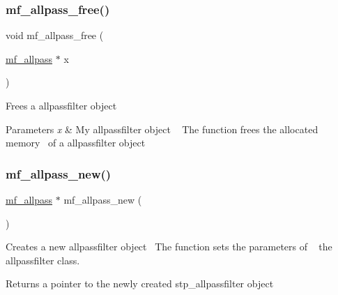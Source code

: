 \subsubsection{\texorpdfstring{mf\+\_\+allpass\+\_\+free()}{mf\_allpass\_free()}}
{\footnotesize\ttfamily void mf\+\_\+allpass\+\_\+free (\begin{DoxyParamCaption}\item[{\mbox{\hyperlink{structmf__allpass}{mf\+\_\+allpass}} $\ast$}]{x }\end{DoxyParamCaption})\hspace{0.3cm}{\ttfamily [related]}}



Frees a allpassfilter object~\newline
 


\begin{DoxyParams}{Parameters}
{\em x} & My allpassfilter object ~\newline
 The function frees the allocated memory~\newline
 of a allpassfilter object \\
\hline
\end{DoxyParams}
\mbox{\label{structmf__allpass_a743b02b600467e4fff788842b303a432}} 
\subsubsection{\texorpdfstring{mf\+\_\+allpass\+\_\+new()}{mf\_allpass\_new()}}
{\footnotesize\ttfamily \mbox{\hyperlink{structmf__allpass}{mf\+\_\+allpass}} $\ast$ mf\+\_\+allpass\+\_\+new (\begin{DoxyParamCaption}{ }\end{DoxyParamCaption})\hspace{0.3cm}{\ttfamily [related]}}



Creates a new allpassfilter object~\newline
 The function sets the parameters of ~\newline
 the allpassfilter class. 

\begin{DoxyReturn}{Returns}
a pointer to the newly created stp\+\_\+allpassfilter object ~\newline
 
\end{DoxyReturn}
\mbox{\label{structmf__allpass_a38ca5027a80c82fd242d7f40e02cd960}} 
